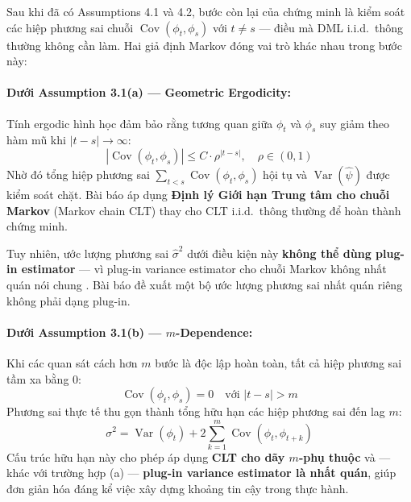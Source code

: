 Sau khi đã có Assumptions 4.1 và 4.2, bước còn lại của chứng minh là kiểm soát các hiệp phương sai chuỗi \(\operatorname{Cov}(\phi_t, \phi_s)\) với \(t \neq s\) --- điều mà DML i.i.d.\ thông thường không cần làm. Hai giả định Markov đóng vai trò khác nhau trong bước này:

\paragraph{Dưới Assumption 3.1(a) --- Geometric Ergodicity:}
Tính ergodic hình học đảm bảo rằng tương quan giữa \(\phi_t\) và \(\phi_s\) suy giảm theo hàm mũ khi \(|t - s| \to \infty\):
\[
    |\operatorname{Cov}(\phi_t, \phi_s)| \leq C \cdot \rho^{|t-s|}, \quad \rho \in (0,1)
\]
Nhờ đó tổng hiệp phương sai \(\sum_{t < s} \operatorname{Cov}(\phi_t, \phi_s)\) hội tụ và \(\operatorname{Var}(\hat{\psi})\) được kiểm soát chặt. Bài báo áp dụng \textbf{Định lý Giới hạn Trung tâm cho chuỗi Markov} (Markov chain CLT) thay cho CLT i.i.d.\ thông thường để hoàn thành chứng minh.

Tuy nhiên, ước lượng phương sai \(\hat{\sigma}^2\) dưới điều kiện này \textbf{không thể dùng plug-in estimator} --- vì plug-in variance estimator cho chuỗi Markov không nhất quán nói chung \cite{jones2006fixed}. Bài báo đề xuất một bộ ước lượng phương sai nhất quán riêng không phải dạng plug-in.

\paragraph{Dưới Assumption 3.1(b) --- \(m\)-Dependence:}
Khi các quan sát cách hơn \(m\) bước là độc lập hoàn toàn, tất cả hiệp phương sai tầm xa bằng 0:
\[
    \operatorname{Cov}(\phi_t, \phi_s) = 0 \quad \text{với } |t - s| > m
\]
Phương sai thực tế thu gọn thành tổng hữu hạn các hiệp phương sai đến lag \(m\):
\[
    \sigma^2 = \operatorname{Var}(\phi_t) + 2\sum_{k=1}^{m} \operatorname{Cov}(\phi_t, \phi_{t+k})
\]
Cấu trúc hữu hạn này cho phép áp dụng \textbf{CLT cho dãy \(m\)-phụ thuộc} và --- khác với trường hợp (a) --- \textbf{plug-in variance estimator là nhất quán}, giúp đơn giản hóa đáng kể việc xây dựng khoảng tin cậy trong thực hành.
